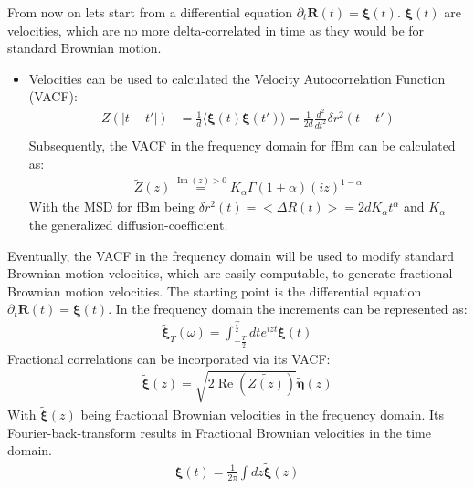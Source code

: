 \documentclass[
  a4paper,BCOR10mm,oneside,
  bibtotoc,idxtotoc,
  headsepline,footsepline,%
  fleqn,openbib
]{scrbook}
\begin{document}
From now on lets start from a differential equation $\partial_t \bm{R}(t)=\bm{\xi}(t)$. $\bm{\xi}(t)$ are velocities, which are no more delta-correlated in time as they would be for standard Brownian motion. 
\begin{itemize} 
\item Velocities can be used to calculated the Velocity Autocorrelation Function (VACF):
\begin{align}
Z(|t-t'|)&= \frac{1}{d}\langle \bm{\xi}(t) \bm{\xi}(t') \rangle = \frac{1}{2d} \frac{d^2}{dt^2} \delta r^2 (t-t')  \\
\end{align}
Subsequently, the VACF in the frequency domain for fBm can be calculated as: 
\begin{align}
  \tilde{Z}(z) \stackrel{\operatorname{Im}(z)> 0} {=}  K_{\alpha} \Gamma(1+\alpha)(i z)^{1-\alpha}
\end{align}
With the MSD for fBm being $\delta r^{2}(t)= < \Delta R(t)>=2dK_{\alpha}t^{\alpha}$ and $K_{\alpha}$  the generalized diffusion-coefficient.
\end{itemize}
Eventually, the VACF in the frequency domain will be used to modify standard Brownian motion velocities, which are easily computable, to generate fractional Brownian motion velocities. The  starting point is the differential equation $\partial_t \bm{R}(t)=\bm{\xi}(t)$. In the frequency domain the increments can be represented as:
\begin{align}
 \tilde{\bm{\xi}}_{T}(\omega)=\int_{-\frac{T}{2}}^{\frac{T}{2}} dt e^{izt} \bm{\xi}(t) \label{eq:fourier}
\end{align}
Fractional correlations can be incorporated via its VACF:
\begin{align}
\tilde{\bm{\xi}}(z) = \sqrt{2 \operatorname{Re} \left(\tilde{Z(z)}\right)}  \tilde{\bm{\eta}}(z) \label{eq:fracvacf}
\end{align}
 With $\tilde{\bm{\xi}}(z)$ being fractional Brownian velocities in the frequency domain. Its Fourier-back-transform results in Fractional Brownian velocities in the time domain.
 \begin{align}
 \bm{\xi}(t)= \frac{1}{2 \pi} \int dz\tilde{\bm{\xi}}(z)
 \end{align}
\end{document}
